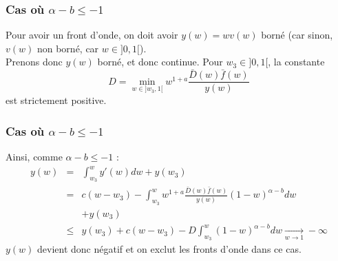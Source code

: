 \documentclass[handout]{beamer}
\begin{document}
\begin{frame}
	\frametitle{Cas où $\alpha-b\leq-1$}
Pour avoir un front d'onde, on doit avoir $y(w)=wv(w)$ borné (car sinon, $v(w)$ non borné, car $w\in ]0,1[$).\\
Prenons donc $y(w)$ borné, et donc continue. Pour $w_3\in]0,1[$, la constante \[D=\min_{w\in ]w_3,1[} w^{1+a} \frac{\bar{D}(w)\bar{f}(w)}{y(w)}\] est strictement positive.
\end{frame}

\begin{frame}
	\frametitle{Cas où $\alpha-b\leq-1$}
Ainsi, comme $\alpha-b\leq -1$ : 
\begin{eqnarray*}
	y(w)&=&\int_{w_3}^w y'(w)dw + y(w_3)\\
		&=& c(w-w_3)-\int_{w_3}^w w^{1+a} \frac{\bar{D}(w)\bar{f}(w)}{y(w)} (1-w)^{\alpha-b} dw \\& &+ y(w_3)\\
		&\leq& y(w_3)+c(w-w_3) -D \int_{w_3}^w (1-w)^{\alpha-b} dw \xrightarrow[w\to 1]{} -\infty
\end{eqnarray*}
$y(w)$ devient donc négatif et on exclut les fronts d'onde dans ce cas.
\end{frame}
\end{document}
